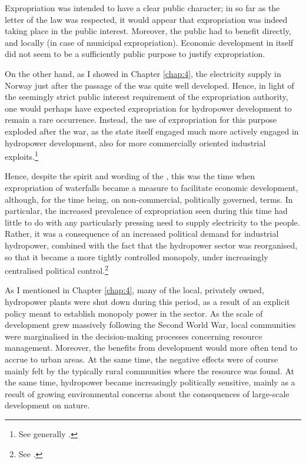 Expropriation was intended to have a clear public character; in so far as the letter of the law was respected, it would appear that expropriation was indeed taking place in the public interest. Moreover, the public had to benefit directly, and locally (in case of municipal expropriation). Economic development in itself did not seem to be a sufficiently public purpose to justify expropriation. 

On the other hand, as I showed in Chapter \ref{chap:4}, the electricity supply in Norway just after the passage of the \cite{wra40} was quite well developed. Hence, in light of the seemingly strict public interest requirement of the expropriation authority, one would perhaps have expected expropriation for hydropower development to remain a rare occurrence. Instead, the use of expropriation for this purpose exploded after the war, as the state itself engaged much more actively engaged in hydropower development, also for more commercially oriented industrial exploits.\footnote{See generally \cite{skjold06}.}

Hence, despite the spirit and wording of the \cite{wra40}, this was the time when expropriation of waterfalls became a measure to facilitate economic development, although, for the time being, on non-commercial, politically governed, terms. In particular, the increased prevalence of expropriation seen during this time had little to do with any particularly pressing need to supply electricity to the people. Rather, it was a consequence of an increased political demand for industrial hydropower, combined with the fact that the hydropower sector was reorganised, so that it became a more tightly controlled monopoly, under increasingly centralised political control.\footnote{See \cite{skjold06,thue06b}.}

As I mentioned in Chapter \ref{chap:4}, many of the local, privately owned, hydropower plants were shut down during this period, as a result of an explicit policy meant to establish monopoly power in the sector. As the scale of development grew massively following the Second World War, local communities were marginalised in the decision-making processes concerning resource management. Moreover, the benefits from development would more often tend to accrue to urban areas. At the same time, the negative effects were of course mainly felt by the typically rural communities where the resource was found. At the same time, hydropower became increasingly politically sensitive, mainly as a result of growing environmental concerns about the consequences of large-scale development on nature.

